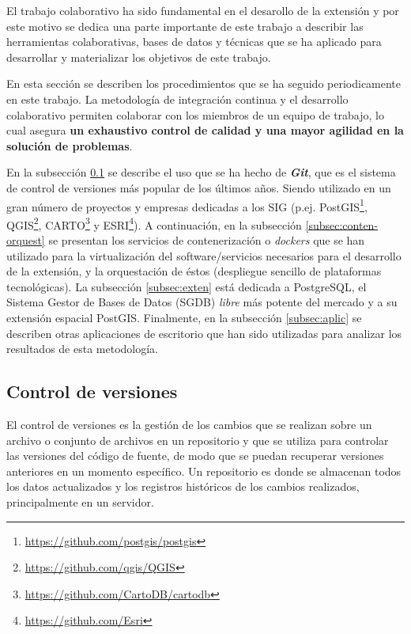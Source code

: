 El trabajo colaborativo ha sido fundamental en el desarollo de la extensión \pgland{} y por este motivo se dedica una parte importante de este trabajo a describir las herramientas colaborativas, bases de datos y técnicas que se ha aplicado para desarrollar y materializar los objetivos de este trabajo.

En esta sección se describen los procedimientos que se ha seguido periodicamente en este trabajo. La metodología de integración continua y el desarrollo colaborativo permiten colaborar con los miembros de un equipo de trabajo, lo cual asegura \textbf{un exhaustivo control de calidad y una mayor agilidad en la solución de problemas}.

En la subsección \ref{subsec:control} se describe el uso que se ha hecho de \textbf{\textit{Git}}, que es el sistema de control de versiones más popular de los últimos años. Siendo utilizado en un gran número de proyectos y empresas dedicadas a los SIG (p.ej. PostGIS\footnote{\href{https://github.com/postgis/postgis}{https://github.com/postgis/postgis}}, QGIS\footnote{\href{https://github.com/qgis/QGIS}{https://github.com/qgis/QGIS}}, CARTO\footnote{\href{https://github.com/CartoDB/cartodb}{https://github.com/CartoDB/cartodb}} y ESRI\footnote{\href{https://github.com/Esri}{https://github.com/Esri}}). A continuación, en la subsección \ref{subsec:conten-orquest} se presentan los servicios de contenerización o \textit{dockers} que se han utilizado para la virtualización del software/servicios necesarios para el desarrollo de la extensión, y la orquestación de éstos (despliegue sencillo de plataformas tecnológicas). La subsección \ref{subsec:exten} está dedicada a PostgreSQL, el Sistema Gestor de Bases de Datos (SGDB) \textit{libre} más potente del mercado y a su extensión espacial PostGIS. Finalmente, en la subsección \ref{subsec:aplic} se describen otras aplicaciones de escritorio que han sido utilizadas para analizar los resultados de esta metodología.


\subsection{Control de versiones}\label{subsec:control}

El control de versiones es la gestión de los cambios que se realizan sobre un archivo o conjunto de archivos en un repositorio y que se utiliza para controlar las versiones del código de fuente, de modo que se puedan recuperar versiones anteriores en un momento específico. Un repositorio es donde se almacenan todos los datos actualizados y los registros históricos de los cambios realizados, principalmente en un servidor.

